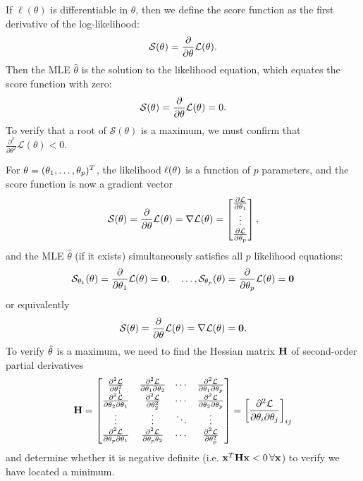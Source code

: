 \documentclass[10pt, a4paper]{article}
\begin{document}
\begin{definition}
    If $\ell(\theta)$ is differentiable in $\theta$,
    then we define the score function as the first derivative of the log-likelihood:
    \[
    \mathcal{S}(\theta) = \pd{\theta}\mathcal{L}(\theta).
    \]
    Then the MLE $\hat{\theta}$ is the solution to the likelihood equation,
    which equates the score function with zero:
    \[
    \mathcal{S}(\theta) = \pd{\theta}\mathcal{L}(\theta) = 0.
    \]
    To verify that a root of $\mathcal{S}(\theta)$ is a maximum,
    we must confirm that $\frac{\partial ^ 2}{\partial \theta ^ 2}\mathcal{L}(\theta) < 0$.
\end{definition}

\begin{definition}
    For $\mbf{\theta} = (\theta_1, \dotsc, \theta_p) ^ T$,
    the likelihood $\ell(\mbf{\theta})$ is a function of $p$ parameters,
    and the score function is now a gradient vector
    \[
    \mathcal{S}(\mbf{\theta}) = \pd{\mbf{\theta}}\mathcal{L}(\mbf{\theta}) = \nabla\mathcal{L}(\mbf{\theta}) = \begin{bmatrix}
        \pd[\mathcal{L}]{\theta_1} \\
        \vdots \\
        \pd[\mathcal{L}]{\theta_p}
    \end{bmatrix},
    \]
    and the MLE $\hat{\theta}$
    (if it exists)
    simultaneously satisfies all $p$ likelihood equations:
    \[
    \mathcal{S}_{\theta_1}(\mbf{\theta}) = \pd{\theta_1}\mathcal{L}(\mbf{\theta}) = \mbf{0},\quad\dotsc, \mathcal{S}_{\theta_p}(\mbf{\theta}) = \pd{\theta_p}\mathcal{L}(\mbf{\theta}) = \mbf{0}
    \]
    or equivalently
    \[
    \mathcal{S}(\mbf{\theta}) = \pd{\mbf{\theta}}\mathcal{L}(\mbf{\theta}) = \nabla\mathcal{L}(\mbf{\theta)} = \mbf{0}.
    \]
    To verify $\hat{\mbf{\theta}}$ is a maximum,
    we need to find the Hessian matrix $\mbf{H}$ of second-order partial derivatives
    \[
    \mbf{H} = \begin{bmatrix}
        \frac{\partial ^ 2\mathcal{L}}{\partial\theta_1 ^ 2} & \frac{\partial ^ 2\mathcal{L}}{\partial\theta_1\partial\theta_2} & \dotsi & \frac{\partial ^ 2\mathcal{L}}{\partial\theta_1\partial\theta_p} \\
        \frac{\partial ^ 2\mathcal{L}}{\partial\theta_2\partial\theta_1} & \frac{\partial ^ 2\mathcal{L}}{\partial\theta_2 ^ 2} & \dotsi & \frac{\partial ^ 2\mathcal{L}}{\partial\theta_2\partial\theta_p} \\
        \vdots & \vdots & \ddots & \vdots \\
        \frac{\partial ^ 2\mathcal{L}}{\partial\theta_p\partial\theta_1} & \frac{\partial ^ 2\mathcal{L}}{\partial\theta_p\theta_2} & \dotsi & \frac{\partial ^ 2\mathcal{L}}{\partial\theta_p ^ 2} \\
    \end{bmatrix} = \left[\frac{\partial ^ 2\mathcal{L}}{\partial\theta_i\partial\theta_j}\right]_{ij}
    \]
    and determine whether it is negative definite
    (i.e. $\mbf{x} ^ T\mbf{H}\mbf{x} < 0\,\forall \mbf{x}$)
    to verify we have located a minimum.
\end{definition}
\end{document}
